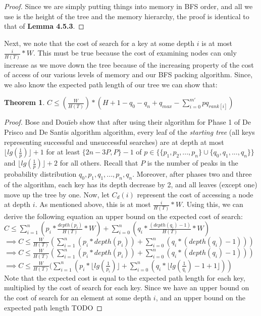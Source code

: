 \documentclass[letterpaper,12pt,titlepage,oneside,final]{book}
\theoremstyle{plain}
\newtheorem{thm}{Theorem}[section]
\begin{document}
\begin{proof}
Since we are simply putting things into memory in BFS order, and all we use is the height of the tree and the memory hierarchy, the proof is identical to that of \textbf{Lemma 4.5.3}.
\end{proof}

Next, we note that the cost of search for a key at some depth $i$ is at most $\frac{i}{H(T)}* W$. This must be true because the cost of examining nodes can only increase as we move down the tree because of the increasing property of the cost of access of our various levels of memory and our BFS packing algorithm. Since, we also know the expected path length of our tree we can show that: \\

\begin{thm}
$C \leq  (\frac{W}{H(T)}) * (H + 1 - q_0 - q_n + q_{max} - \sum_{i=0}^{m'} pq_{rank[i]})$
\end{thm}

\begin{proof}

Bose and Dou\"{i}eb show that after using their algorithm for Phase 1 of De Prisco and De Santis algorithm algorithm, every leaf of the \textit{starting tree} (all keys representing successful and unsuccessful searches) are at depth at most $\lfloor lg(\frac{1}{p}) \rfloor + 1$  for at least $\{2n-3P,P\}-1$ of $p \in \{ \{p_1, p_2, ..., p_n \} \cup \{ q_0, q_1, ..., q_n \} \}$ and $\lfloor lg(\frac{1}{p}) \rfloor + 2$ for all others. Recall that $P$ is the number of peaks in the probability distribution $q_0, p_1, q_1, ..., p_n, q_n$. Moreover, after phases two and three of the algorithm, each key has its depth decrease by 2, and all leaves (except one) move up the tree by one. Now, let $C_d(i)$ represent the cost of accessing a node at depth $i$. As mentioned above, this is at most $\frac{i}{H(T)}* W$. Using this, we can derive the following equation an upper bound on the expected cost of search: \\

$C \leq \sum_{i=1}^{n}(p_i*\frac{depth(p_i)}{H(T)}* W)+ \sum_{i=0}^{n}(q_i*\frac{(depth(q_i)-1)}{H(T)}* W)$ \\

$\implies C \leq \frac{W}{H(T)}(\sum_{i=1}^{n}(p_i*depth(p_i))+ \sum_{i=0}^{n}(q_i*(depth(q_i)-1)))$ \\

$\implies C \leq \frac{W}{H(T)}(\sum_{i=1}^{n}(p_i*depth(p_i))+ \sum_{i=0}^{n}(q_i*(depth(q_i)-1)))$ \\

$\implies C \leq \frac{W}{H(T)}(\sum_{i=1}^{n}(p_i*\lfloor lg(\frac{1}{p_i}) \rfloor+ \sum_{i=0}^{n}(q_i*\lfloor lg(\frac{1}{q_i}) -1 + 1 \rfloor) )$ \\

Note that the expected cost is equal to the expected path length for each key, multiplied by the cost of search for each key. Since we have an upper bound on the cost of search for an element at some depth $i$, and an upper bound on the expected path length TODO
\end{proof}
\end{document}
